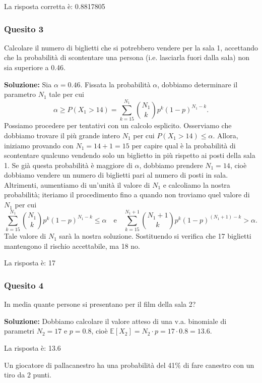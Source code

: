 \documentclass[12pt, a4paper]{article}
\begin{document}
La risposta corretta è: 0.8817805

\subsubsection*{Quesito 3}
Calcolare il numero di biglietti che si potrebbero vendere per la sala 1, accettando che la probabilità di scontentare una persona (i.e. lasciarla fuori dalla sala) non sia superiore a 0.46.

\textbf{Soluzione:}
Sia $\alpha=0.46$. Fissata la probabilità $\alpha$, dobbiamo determinare il parametro $N_1$ tale per cui 
$$ \alpha \geq P(X_1 > 14) = \sum_{k=15}^{N_1} \binom{N_1}{k} p^k (1-p)^{N_1-k}. $$
Possiamo procedere per tentativi con un calcolo esplicito. Osserviamo che dobbiamo trovare il più grande intero $N_1$ per cui $P(X_1 > 14) \leq \alpha$. Allora, iniziamo provando con $N_1 = 14+1 = 15$ per capire qual è la probabilità di scontentare qualcuno vendendo solo un biglietto in più rispetto ai posti della sala 1. Se già questa probabilità è maggiore di $\alpha$, dobbiamo prendere $N_1=14$, cioè dobbiamo vendere un numero di biglietti pari al numero di posti in sala.
Altrimenti, aumentiamo di un’unità il valore di $N_1$ e calcoliamo la nostra probabilità; iteriamo il procedimento fino a quando non troviamo quel valore di $N_1$ per cui
$$ \sum_{k=15}^{N_1} \binom{N_1}{k} p^k (1-p)^{N_1-k} \leq \alpha \quad \text{e} \quad \sum_{k=15}^{N_1+1} \binom{N_1+1}{k} p^k (1-p)^{(N_1+1)-k} > \alpha. $$
Tale valore di $N_1$ sarà la nostra soluzione. Sostituendo si verifica che 17 biglietti mantengono il rischio accettabile, ma 18 no.

La risposta è: 17

\subsubsection*{Quesito 4}
In media quante persone si presentano per il film della sala 2?

\textbf{Soluzione:}
Dobbiamo calcolare il valore atteso di una v.a. binomiale di parametri $N_2=17$ e $p=0.8$, cioè $\mathbb{E}[X_2] = N_2 \cdot p = 17 \cdot 0.8 = 13.6$.

La risposta è: 13.6


\vspace{0.5cm}
\begin{tcolorbox}[colback=lightergray!10, colframe=tocsec, title=\textbf{Esercizio 9}]
Un giocatore di pallacanestro ha una probabilità del 41\% di fare canestro con un tiro da 2 punti.
\end{tcolorbox}
\end{document}
